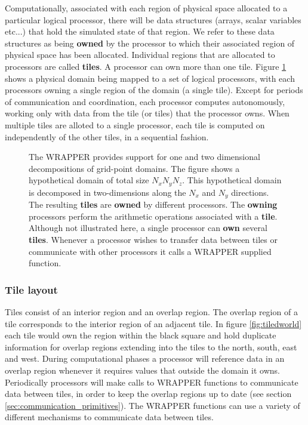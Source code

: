 Computationally, associated with each region of physical 
space allocated to a particular logical processor, there will be data 
structures (arrays, scalar variables etc...) that hold the simulated state of 
that region. We refer to these data structures as being {\bf owned} by the 
processor to which their
associated region of physical space has been allocated. Individual
regions that are allocated to processors are called {\bf tiles}. A 
processor can own more 
than one tile. Figure \ref{fig:domaindecomp} shows a physical domain being
mapped to a set of logical processors, with each processors owning a single 
region of the domain (a single tile). Except for periods of
communication and coordination, each processor computes autonomously, working 
only with data from the tile (or tiles) that the processor owns. When multiple 
tiles are alloted to a single processor, each tile is computed on 
independently of the other tiles, in a sequential fashion. 

\begin{figure}
\begin{center}
\end{center}
\caption{ The WRAPPER provides support for one and two dimensional 
decompositions of grid-point domains. The figure shows a hypothetical domain of 
total size $N_{x}N_{y}N_{z}$. This hypothetical domain is decomposed in 
two-dimensions along the $N_{x}$ and $N_{y}$ directions. The resulting {\bf 
tiles} are {\bf owned} by different processors. The {\bf owning} 
processors perform the 
arithmetic operations associated with a {\bf tile}. Although not illustrated 
here, a single processor can {\bf own} several {\bf tiles}.
Whenever a processor wishes to transfer data between tiles or
communicate with other processors it calls a WRAPPER supplied
function.
} \label{fig:domaindecomp} 
\end{figure}


\subsubsection{Tile layout}

Tiles consist of an interior region and an overlap region. The overlap region 
of a tile corresponds to the interior region of an adjacent tile. 
In figure \ref{fig:tiledworld} each tile would own the region
within the black square and hold duplicate information for overlap
regions extending into the tiles to the north, south, east and west.
During 
computational phases a processor will reference data in an overlap region 
whenever it requires values that outside the domain it owns. Periodically 
processors will make calls to WRAPPER functions to communicate data between 
tiles, in order to keep the overlap regions up to date (see section 
\ref{sec:communication_primitives}). The WRAPPER functions can use a
variety of different mechanisms to communicate data between tiles.

